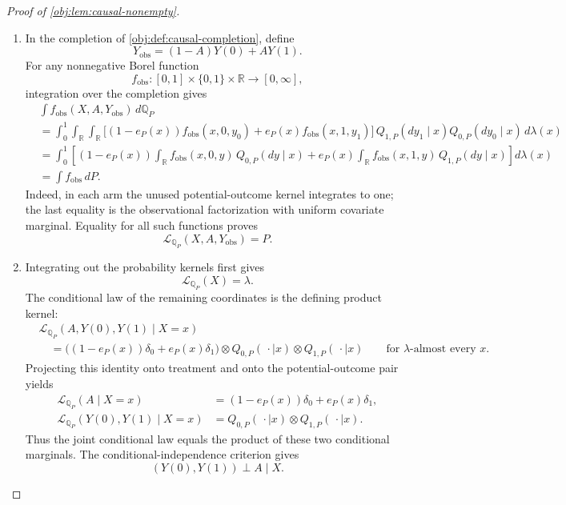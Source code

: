 \documentclass[11pt]{article}
\begin{document}
\begin{proof}[Proof of \cref{obj:lem:causal-nonempty}]
\begin{enumerate}
\item In the completion of \cref{obj:def:causal-completion}, define
\[
Y_{\mathrm{obs}}=(1-A)Y(0)+AY(1).
\]
For any nonnegative Borel function
\[
f_{\mathrm{obs}}:[0,1]\times\{0,1\}\times\mathbb R
\longrightarrow[0,\infty],
\]
integration over the completion gives
\[
\begin{aligned}
&\int f_{\mathrm{obs}}(X,A,Y_{\mathrm{obs}})\,d\mathbb Q_P\\
&=\int_0^1
 \int_{\mathbb R}\int_{\mathbb R}
 \bigl[
 (1-e_P(x))f_{\mathrm{obs}}(x,0,y_0)
 +e_P(x)f_{\mathrm{obs}}(x,1,y_1)
 \bigr]\,
 Q_{1,P}(dy_1\mid x)Q_{0,P}(dy_0\mid x)\,d\lambda(x)\\
&=\int_0^1\left[
 (1-e_P(x))\int_{\mathbb R}f_{\mathrm{obs}}(x,0,y)\,Q_{0,P}(dy\mid x)
 +e_P(x)\int_{\mathbb R}f_{\mathrm{obs}}(x,1,y)\,Q_{1,P}(dy\mid x)
 \right]d\lambda(x)\\
&=\int f_{\mathrm{obs}}\,dP.
\end{aligned}
\]
Indeed, in each arm the unused potential-outcome kernel integrates to one; the last equality is the observational factorization with uniform covariate marginal. Equality for all such functions proves
\[
\mathcal L_{\mathbb Q_P}(X,A,Y_{\mathrm{obs}})=P.
\]

\item\label{proof:causal-nonempty:conditional-law} Integrating out the probability kernels first gives
\[
\mathcal L_{\mathbb Q_P}(X)=\lambda.
\]
The conditional law of the remaining coordinates is the defining product kernel:
\[
\begin{aligned}
&\mathcal L_{\mathbb Q_P}(A,Y(0),Y(1)\mid X=x)\\
&\quad=
\bigl((1-e_P(x))\delta_0+e_P(x)\delta_1\bigr)
\otimes Q_{0,P}(\,\cdot\mid x)
\otimes Q_{1,P}(\,\cdot\mid x)
\qquad\text{for \(\lambda\)-almost every }x.
\end{aligned}
\]
Projecting this identity onto treatment and onto the potential-outcome pair yields
\[
\begin{aligned}
\mathcal L_{\mathbb Q_P}(A\mid X=x)
&=(1-e_P(x))\delta_0+e_P(x)\delta_1,\\
\mathcal L_{\mathbb Q_P}(Y(0),Y(1)\mid X=x)
&=Q_{0,P}(\,\cdot\mid x)\otimes Q_{1,P}(\,\cdot\mid x).
\end{aligned}
\]
Thus the joint conditional law equals the product of these two conditional marginals. The conditional-independence criterion gives
\[
(Y(0),Y(1))\perp A\mid X.
\]


\end{enumerate}
\end{proof}
\end{document}
